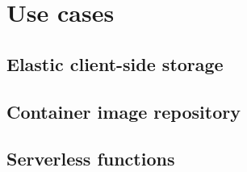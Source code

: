 \section{Use cases}
\label{sec:usecases}


\subsection{Elastic client-side storage}
\label{sec:usecase:elasticstorage}


\subsection{Container image repository}
\label{sec:usecase:containers}


\subsection{Serverless functions}
\label{sec:usecase:serverless}

